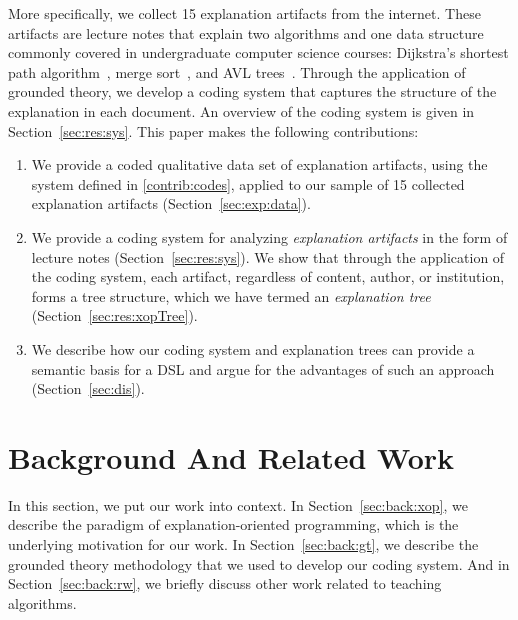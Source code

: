 \documentclass[sigconf]{acmart}
\begin{document}
More specifically, we collect 15 explanation artifacts from the internet. These
artifacts are lecture notes that explain two algorithms and one data structure
commonly covered in undergraduate computer science courses: Dijkstra's shortest
path algorithm~\cite[pp.~137--142]{KT06}, merge sort~\cite[210--214]{KT06}, and
AVL trees~\cite[pp.~458--475]{KnuthArt3}.
%
Through the application of grounded theory, we develop a coding system that
captures the structure of the explanation in each document. An overview of the
coding system is given in Section~\ref{sec:res:sys}. This paper makes the
following contributions:
%
\begin{enumerate}[label=C\arabic*.]


\item \label{contrib:data}
%
We provide a coded qualitative data set of explanation artifacts, using the
system defined in \ref{contrib:codes}, applied to our sample of 15 collected
explanation artifacts (Section~\ref{sec:exp:data}).

\item \label{contrib:codes}
%
We provide a coding system for analyzing \emph{explanation artifacts} in the
form of lecture notes (Section~\ref{sec:res:sys}). We show that through the
application of the coding system, each artifact, regardless of content, author,
or institution, forms a tree structure, which we have termed an
\emph{explanation tree} (Section~\ref{sec:res:xopTree}).


\item \label{contrib:DSL}
%
We describe how our coding system and explanation trees can provide a semantic
basis for a DSL and argue for the advantages of such an approach
(Section~\ref{sec:dis}).
%
\end{enumerate}

\noindent

\section{Background And Related Work}
\label{sec:back}

In this section, we put our work into context.
%
In Section~\ref{sec:back:xop}, we describe the paradigm of explanation-oriented
programming, which is the underlying motivation for our work.
%
In Section~\ref{sec:back:gt}, we describe the grounded theory methodology that
we used to develop our coding system.
%
And in Section~\ref{sec:back:rw}, we briefly discuss other work related to
teaching algorithms.
\end{document}
